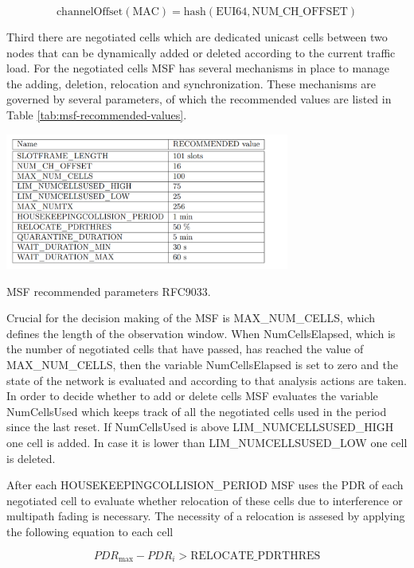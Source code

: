 \documentclass{comnets-thesis}
\begin{document}
\begin{equation}
    \text{channelOffset}(\text{MAC}) = \text{hash}(\text{EUI64}, \text{NUM\_CH\_OFFSET})
    \label{eq:msf-autonomous-cells-channel}
\end{equation}


Third there are negotiated cells which are dedicated unicast cells between two nodes that can be dynamically added or deleted according to the current traffic load.
For the negotiated cells \ac{MSF} has several mechanisms in place to manage the adding, deletion, relocation and synchronization. These mechanisms are governed by several parameters, of which the recommended values are listed in Table \ref{tab:msf-recommended-values}.
\begin{table}
    \centering
    \includegraphics[width=0.7\textwidth]{./images/MSF recommended values .png}
    \caption{MSF recommended parameters RFC9033. \cite{RFC9033ForMSF}}
    \label{tab:msf-recommended-values}
\end{table}

Crucial for the decision making of the \ac{MSF} is MAX\_NUM\_CELLS, which defines the length of the observation window. When NumCellsElapsed, which is the number of negotiated cells that have passed, has reached the value of MAX\_NUM\_CELLS, then the variable NumCellsElapsed is set to zero and the state of the network is evaluated and according to that analysis actions are taken.
In order to decide whether to add or delete cells MSF evaluates the variable NumCellsUsed which keeps track of all the negotiated cells used in the period since the last reset. If NumCellsUsed is above LIM\_NUMCELLSUSED\_HIGH one cell is added. In case it is lower than LIM\_NUMCELLSUSED\_LOW one cell is deleted.

After each HOUSEKEEPINGCOLLISION\_PERIOD \ac{MSF} uses the \ac{PDR} of each negotiated cell to evaluate whether relocation of these cells due to interference or multipath fading is necessary. The necessity of a relocation is assesed by applying the following equation to each cell

\begin{equation}
    PDR_{\max} - PDR_i  > \text{RELOCATE\_PDRTHRES}
	\label{eq:relocation}
\end{equation}
\end{document}
